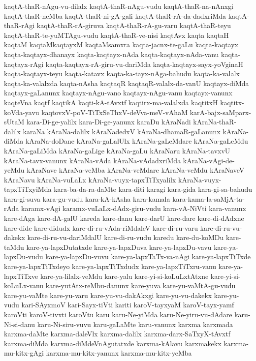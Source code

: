 {kaqtA-thaR-nAgu-vu-dilalx
kaqtA-thaR-nAgu-vudu
kaqtA-thaR-na-nAnxgi
kaqtA-thaR-neMba
kaqtA-thaR-ni-gA-gali
kaqtA-thaR-rA-da-dadxriMda
kaqtA-thaR-rAgi
kaqtA-thaR-rA-giruva
kaqtA-thaR-rA-gu-varu
kaqtA-thaR-teyu
kaqtA-thaR-te-yuMTAgu-vudu
kaqtA-thaR-ve-nisi
kaqtAvx
kaqta
kaqtaH
kaqtaM
kaqtaMkaqtayxM
kaqtaMsamxra
kaqta-jacnx-te-gaLu
kaqta-kaqtayx
kaqta-kaqtayx-dhanayx
kaqta-kaqtayx-nAda
kaqta-kaqtayx-nAda-vanu
kaqta-kaqtayx-rAgi
kaqta-kaqtayx-rA-giru-vu-dariMda
kaqta-kaqtayx-sayx-yoVginaH
kaqta-kaqtayx-teyu
kaqta-katavx
kaqta-ka-tayx-nAga-bahudu
kaqta-ka-valalx
kaqta-ka-valalxda
kaqta-nAsha
kaqtaqR
kaqtaqR-valalx-da-vanU
kaqtayx-diMda
kaqtayx-gaLanunx
kaqtayx-nAgu-vano
kaqtayx-nAgu-vanu
kaqtayx-vanunx
kaqteVna
kaqtf
kaqtikA
kaqti-kA-tAvxtf
kaqtirx-ma-valalxda
kaqtitxH
kaqtitx-koVda-yavu
kaqtovxV-poV-TiTxSeThxV-deVva-meV-vAhaM
karA-bajx-saMparx-sUtaM
kara-Di-ge-yalilx
kara-Di-ge-yanunx
karaDu
kAraNadi
kAraNa-thaR-dalilx
karaNa
kAraNa-dalilx
kAraNadedxV
kAraNa-dhamaR-gaLanunx
kAraNa-diMda
kAraNa-doDane
kAraNa-gaLalUlx
kAraNa-gaLeMdare
kAraNa-gaLeMdu
kAraNa-gaLiMda
kAraNa-gaLige
kAraNa-gaLu
kAraNaru
kAraNa-tavxvU
kAraNa-tavx-vanunx
kAraNa-vAda
kAraNa-vAdadxriMda
kAraNa-vAgi-de-yeMdu
kAraNave
kAraNa-veMba
kAraNa-veMdare
kAraNa-veMdu
kAraNaveV
kAraNavu
kAraNa-vuLaLx
kAraNa-vuyx-tapxTiTxyalilx
kAraNa-vuyx-tapxTiTxyiMda
kara-ba-da-ra-daMte
kara-diti
karagi
kara-gida
kara-gi-sa-bahudu
kara-gi-suva
kara-gu-vudu
kara-kA-kAsha
kara-kamala
kara-kama-la-saMjA-ta-rAda
karamx-vAgi
karamx-vuLaLx-dAdx-giru-vudu
kara-vA-NiVti
kara-vanunx
kare-dAga
kare-dA-galU
kareda
kare-danu
kare-darU
kare-dare
kare-di-dAdxne
kare-dide
kare-didudx
kare-di-ru-vAda-riMdaleV
kare-di-ru-varu
kare-di-ru-vu-dakekx
kare-di-ru-vu-dariMdalU
kare-di-ru-vudu
karedu
kare-du-koMDu
kare-taMdu
kare-ya-lapxDutatxde
kare-ya-lapxDuva
kare-ya-lapxDu-vavu
kare-ya-lapxDu-vudu
kare-ya-lapxDu-vuvu
kare-ya-lapxTaTx-va-nAgi
kare-ya-lapxTiTxde
kare-ya-lapxTiTxdeyo
kare-ya-lapxTiTxdudx
kare-ya-lapxTiTxru-vanu
kare-ya-lapxTiTxve
kare-ya-lilalx-veMdu
kare-yalu
kare-yi-si-koLuLxtAtxne
kare-yi-si-koLuLx-vanu
kare-yutAtx-reMbu-danunx
kare-yuva
kare-yu-vaMtA-gu-vudu
kare-yu-vaMte
kare-yu-varu
kare-yu-vu-dakAkxgi
kare-yu-vu-dakekx
kare-yu-vudu
kari-SAyxmoV
kari-Sayx-tiVti
kariti
karoV-tayxyaM
karoV-tayx-yamf
karoVti
karoV-tivxti
karoVtu
karu
karu-Ne-yiMda
karu-Ne-yiru-vu-dAdare
karu-Ni-si-danu
karu-Ni-siru-vuvu
karu-gaLaMte
karu-vanunx
karxma
karxmada
karxma-daMte
karxma-daleVlx
karxma-dalilx
karxma-darx-SaTxyX-tAvxtf
karxma-diMda
karxma-diMdeVnAgutatxde
karxma-kAlavu
karxmakekx
karxma-mu-kitx-gAgi
karxma-mu-kitx-yanunx
karxma-mu-kitx-yeMba
}
